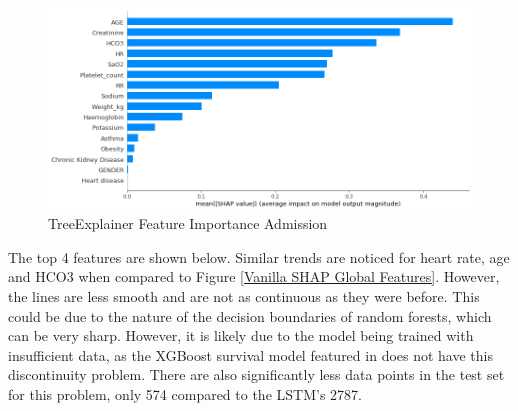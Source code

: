 \documentclass[12pt]{article}
\begin{document}
\begin{figure}[H]
\centering\caption{TreeExplainer Feature Importance Admission}
\includegraphics[scale=0.4]{TreeExplainer Admission1 Feature Importance.png}
\end{figure}
The top 4 features are shown below. Similar trends are noticed for heart rate, age and HCO3 when compared to Figure \ref{Vanilla SHAP Global Features}. However, the lines are less smooth and are not as continuous as they were before. This could be due to the nature of the decision boundaries of random forests, which can be very sharp. However, it is likely due to the model being trained with insufficient data, as the XGBoost survival model featured in \cite{SHAPInteraction} does not have this discontinuity problem. There are also significantly less data points in the test set for this problem, only 574 compared to the LSTM's 2787. 
\end{document}
